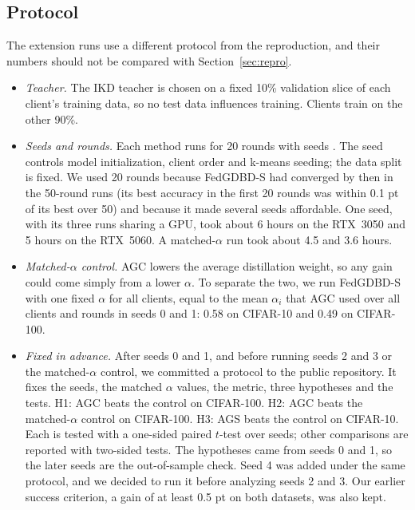 \documentclass[conference]{IEEEtran}
\begin{document}
\subsection{Protocol}
\label{sec:protocol}
The extension runs use a different protocol from the reproduction, and their numbers should not be compared with Section~\ref{sec:repro}.
\begin{itemize}
\item \textit{Teacher.} The IKD teacher is chosen on a fixed 10\% validation slice of each client's training data, so no test data influences training. Clients train on the other 90\%.
\item \textit{Seeds and rounds.} Each method runs for 20 rounds with seeds \SeedList{}. The seed controls model initialization, client order and k-means seeding; the data split is fixed. We used 20 rounds because FedGDBD-S had converged by then in the 50-round runs (its best accuracy in the first 20 rounds was within 0.1 pt of its best over 50) and because it made several seeds affordable. One seed, with its three runs sharing a GPU, took about 6 hours on the RTX~3050 and 5 hours on the RTX~5060. A matched-$\alpha$ run took about 4.5 and 3.6 hours.
\item \textit{Matched-$\alpha$ control.} AGC lowers the average distillation weight, so any gain could come simply from a lower $\alpha$. To separate the two, we run FedGDBD-S with one fixed $\alpha$ for all clients, equal to the mean $\alpha_i$ that AGC used over all clients and rounds in seeds 0 and 1: 0.58 on CIFAR-10 and 0.49 on CIFAR-100.
\item \textit{Fixed in advance.} After seeds 0 and 1, and before running seeds 2 and 3 or the matched-$\alpha$ control, we committed a protocol to the public repository. It fixes the seeds, the matched $\alpha$ values, the metric, three hypotheses and the tests. H1: AGC beats the control on CIFAR-100. H2: AGC beats the matched-$\alpha$ control on CIFAR-100. H3: AGS beats the control on CIFAR-10. Each is tested with a one-sided paired $t$-test over seeds; other comparisons are reported with two-sided tests. The hypotheses came from seeds 0 and 1, so the later seeds are the out-of-sample check. Seed 4 was added under the same protocol, and we decided to run it before analyzing seeds 2 and 3. Our earlier success criterion, a gain of at least 0.5 pt on both datasets, was also kept.
\end{itemize}
\end{document}
